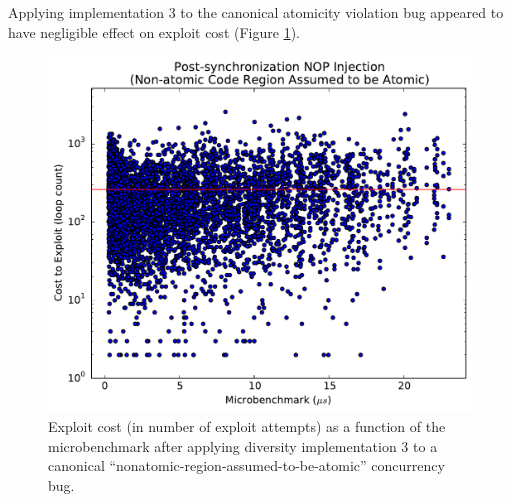 Applying implementation 3 to the canonical atomicity violation bug appeared to have negligible effect on exploit cost (Figure \ref{fig_nonatomic-post}). 
\begin{figure}
	\centering
	\includegraphics[width=\columnwidth]{figures/nonatomic-post}
	\caption{Exploit cost (in number of exploit attempts) as a function of the
  microbenchmark after applying diversity implementation 3 to a canonical
  ``nonatomic-region-assumed-to-be-atomic'' concurrency bug.}
	\label{fig_nonatomic-post}
\end{figure}

